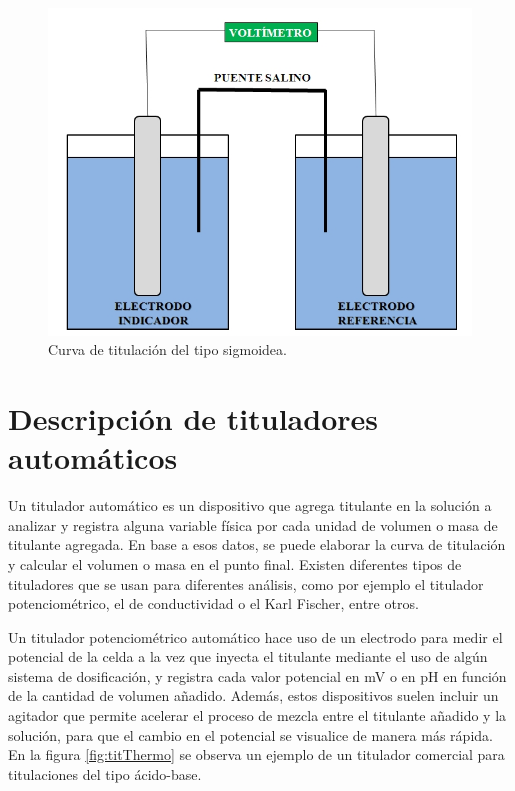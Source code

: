 \begin{figure}[htbp]
	\centering
	\includegraphics[width=.5\textwidth]{./Figures/Potenciometria-img.jpg}
	\caption{Curva de titulación del tipo sigmoidea\protect\footnotemark.}
	\label{fig:potenciometria}
\end{figure}

\section{Descripción de tituladores automáticos}
\label{tituladoresAutomaticos}

Un titulador automático es un dispositivo que agrega titulante en la solución a analizar y registra alguna variable física por cada unidad de volumen o masa de titulante agregada. En base a esos datos, se puede elaborar la curva de titulación y calcular el volumen o masa en el punto final.
Existen diferentes tipos de tituladores que se usan para diferentes análisis, como por ejemplo el titulador potenciométrico, el de conductividad o el Karl Fischer, entre otros.

Un titulador potenciométrico automático hace uso de un electrodo para medir el potencial de la celda a la vez que inyecta el titulante mediante el uso de algún sistema de dosificación, y registra cada valor potencial en mV o en pH en función de la cantidad de volumen añadido. Además, estos dispositivos suelen incluir un agitador que permite acelerar el proceso de mezcla entre el titulante añadido y la solución, para que el cambio en el potencial se visualice de manera más rápida.
En la figura \ref{fig:titThermo} se observa un ejemplo de un titulador comercial para titulaciones del tipo ácido-base.

